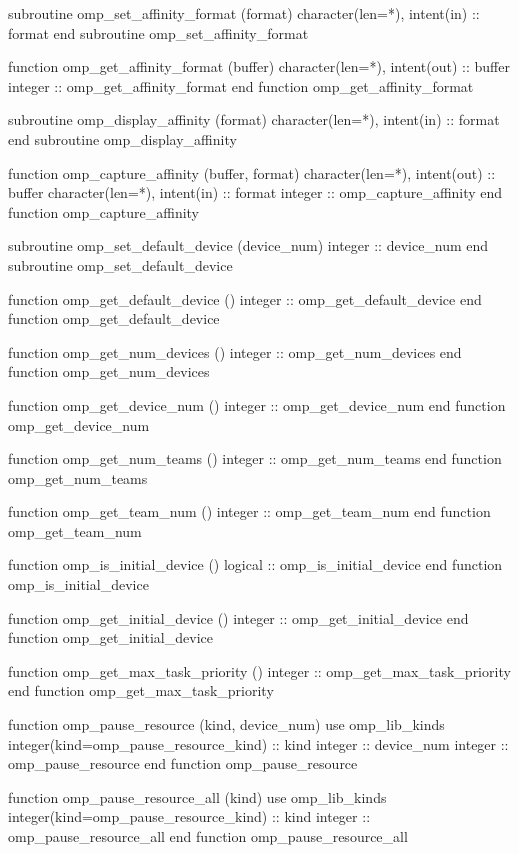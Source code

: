 {\begin{ompfFunction}
    subroutine omp_set_affinity_format (format)
      character(len=*), intent(in) :: format
    end subroutine omp_set_affinity_format

    function omp_get_affinity_format (buffer)
      character(len=*), intent(out) :: buffer
      integer :: omp_get_affinity_format
    end function omp_get_affinity_format

    subroutine omp_display_affinity (format)
      character(len=*), intent(in) :: format
    end subroutine omp_display_affinity

    function omp_capture_affinity (buffer, format)
      character(len=*), intent(out) :: buffer
      character(len=*), intent(in) :: format
      integer :: omp_capture_affinity
    end function omp_capture_affinity

    subroutine omp_set_default_device (device_num)
      integer :: device_num
    end subroutine omp_set_default_device

    function omp_get_default_device ()
      integer :: omp_get_default_device
    end function omp_get_default_device

    function omp_get_num_devices ()
      integer :: omp_get_num_devices
    end function omp_get_num_devices

    function omp_get_device_num ()
      integer :: omp_get_device_num
    end function omp_get_device_num

    function omp_get_num_teams ()
      integer :: omp_get_num_teams
    end function omp_get_num_teams

    function omp_get_team_num ()
      integer :: omp_get_team_num
    end function omp_get_team_num

    function omp_is_initial_device ()
      logical :: omp_is_initial_device
    end function omp_is_initial_device

    function omp_get_initial_device ()
      integer :: omp_get_initial_device
    end function omp_get_initial_device

    function omp_get_max_task_priority ()
      integer :: omp_get_max_task_priority
    end function omp_get_max_task_priority

    function omp_pause_resource (kind, device_num)
      use omp_lib_kinds
      integer(kind=omp_pause_resource_kind) :: kind
      integer :: device_num
      integer :: omp_pause_resource
    end function omp_pause_resource

    function omp_pause_resource_all (kind)
      use omp_lib_kinds
      integer(kind=omp_pause_resource_kind) :: kind
      integer :: omp_pause_resource_all
    end function omp_pause_resource_all


\end{ompfFunction}}
